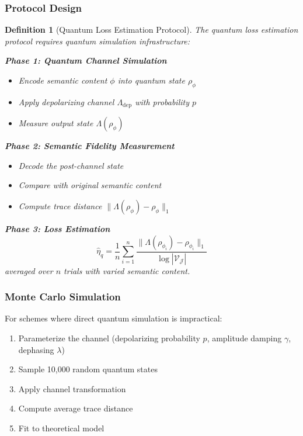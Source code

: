 \documentclass{ieeeaccess}
\newtheorem{definition}{Definition}[section]
\begin{document}
\subsubsection{Protocol Design}

\begin{definition}[Quantum Loss Estimation Protocol]
The quantum loss estimation protocol requires quantum simulation infrastructure:

\textbf{Phase 1: Quantum Channel Simulation}
\begin{itemize}
    \item Encode semantic content $\phi$ into quantum state $\rho_\phi$
    \item Apply depolarizing channel $\Lambda_{\text{dep}}$ with probability $p$
    \item Measure output state $\Lambda(\rho_\phi)$
\end{itemize}

\textbf{Phase 2: Semantic Fidelity Measurement}
\begin{itemize}
    \item Decode the post-channel state
    \item Compare with original semantic content
    \item Compute trace distance $\|\Lambda(\rho_\phi) - \rho_\phi\|_1$
\end{itemize}

\textbf{Phase 3: Loss Estimation}
\begin{equation}
    \hat{\eta}_q = \frac{1}{n}\sum_{i=1}^{n} \frac{\|\Lambda(\rho_{\phi_i}) - \rho_{\phi_i}\|_1}{\log|\mathcal{V}_\mathcal{J}|}
\end{equation}
averaged over $n$ trials with varied semantic content.
\end{definition}


\subsubsection{Monte Carlo Simulation}

For schemes where direct quantum simulation is impractical:
\begin{enumerate}
    \item Parameterize the channel (depolarizing probability $p$, amplitude damping $\gamma$, dephasing $\lambda$)
    \item Sample 10,000 random quantum states
    \item Apply channel transformation
    \item Compute average trace distance
    \item Fit to theoretical model
\end{enumerate}
\end{document}
